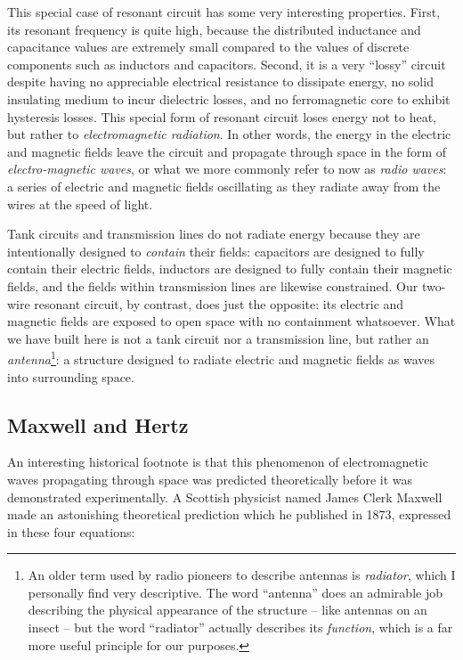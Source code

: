 This special case of resonant circuit has some very interesting properties.  First, its resonant frequency is quite high, because the distributed inductance and capacitance values are extremely small compared to the values of discrete components such as inductors and capacitors.  Second, it is a very ``lossy'' circuit despite having no appreciable electrical resistance to dissipate energy, no solid insulating medium to incur dielectric losses, and no ferromagnetic core to exhibit hysteresis losses.  This special form of resonant circuit loses energy not to heat, but rather to \textit{electromagnetic radiation}.  In other words, the energy in the electric and magnetic fields leave the circuit and propagate through space in the form of \textit{electro-magnetic waves}, or what we more commonly refer to now as \textit{radio waves}: a series of electric and magnetic fields oscillating as they radiate away from the wires at the speed of light.    

Tank circuits and transmission lines do not radiate energy because they are intentionally designed to \textit{contain} their fields: capacitors are designed to fully contain their electric fields, inductors are designed to fully contain their magnetic fields, and the fields within transmission lines are likewise constrained.  Our two-wire resonant circuit, by contrast, does just the opposite: its electric and magnetic fields are exposed to open space with no containment whatsoever.  What we have built here is not a tank circuit nor a transmission line, but rather an \textit{antenna}\footnote{An older term used by radio pioneers to describe antennas is \textit{radiator}, which I personally find very descriptive.  The word ``antenna'' does an admirable job describing the physical appearance of the structure -- like antennas on an insect -- but the word ``radiator'' actually describes its \textit{function}, which is a far more useful principle for our purposes.}: a structure designed to radiate electric and magnetic fields as waves into surrounding space.






\filbreak
\subsection{Maxwell and Hertz}

An interesting historical footnote is that this phenomenon of electromagnetic waves propagating through space was predicted theoretically before it was demonstrated experimentally.  A Scottish physicist named James Clerk Maxwell made an astonishing theoretical prediction which he published in 1873, expressed in these four equations:  

